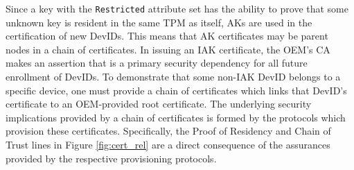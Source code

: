 Since a key with the \verb|Restricted| attribute set has the ability to prove that some unknown key is resident in the same TPM as itself, AKs are used in the certification of new DevIDs. This means that AK certificates may be parent nodes in a chain of certificates. 
In issuing an IAK certificate, the OEM's CA makes an assertion that is a primary security dependency for all future enrollment of DevIDs. 
To demonstrate that some non-IAK DevID belongs to  a specific device, one must provide a chain of certificates which links that DevID's certificate to an OEM-provided root certificate.
The underlying security implications provided by a chain of certificates is formed by the protocols which provision these certificates. Specifically, the Proof of Residency and Chain of Trust lines in Figure \ref{fig:cert_rel} are a direct consequence of the assurances provided by the respective provisioning protocols.




